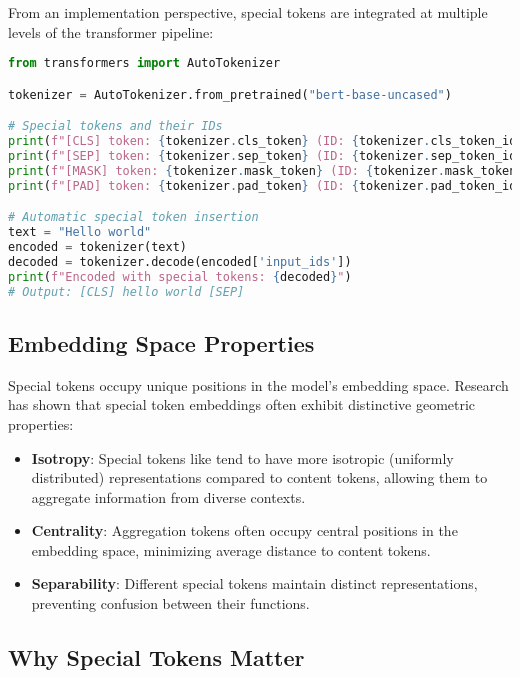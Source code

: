 From an implementation perspective, special tokens are integrated at multiple levels of the transformer pipeline:

\begin{lstlisting}[language=Python, caption=Tokenizer Configuration]
from transformers import AutoTokenizer

tokenizer = AutoTokenizer.from_pretrained("bert-base-uncased")

# Special tokens and their IDs
print(f"[CLS] token: {tokenizer.cls_token} (ID: {tokenizer.cls_token_id})")
print(f"[SEP] token: {tokenizer.sep_token} (ID: {tokenizer.sep_token_id})")
print(f"[MASK] token: {tokenizer.mask_token} (ID: {tokenizer.mask_token_id})")
print(f"[PAD] token: {tokenizer.pad_token} (ID: {tokenizer.pad_token_id})")

# Automatic special token insertion
text = "Hello world"
encoded = tokenizer(text)
decoded = tokenizer.decode(encoded['input_ids'])
print(f"Encoded with special tokens: {decoded}")
# Output: [CLS] hello world [SEP]
\end{lstlisting}

\subsection{Embedding Space Properties}

Special tokens occupy unique positions in the model's embedding space. Research has shown that special token embeddings often exhibit distinctive geometric properties:

\begin{itemize}
\item \textbf{Isotropy}: Special tokens like \cls{} tend to have more isotropic (uniformly distributed) representations compared to content tokens, allowing them to aggregate information from diverse contexts.

\item \textbf{Centrality}: Aggregation tokens often occupy central positions in the embedding space, minimizing average distance to content tokens.

\item \textbf{Separability}: Different special tokens maintain distinct representations, preventing confusion between their functions.
\end{itemize}

\subsection{Why Special Tokens Matter}

